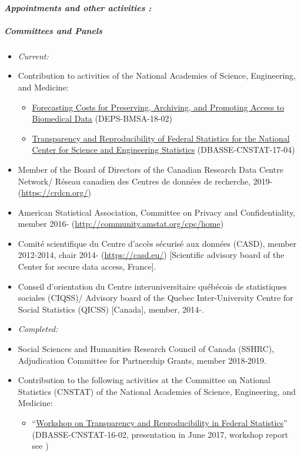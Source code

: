 \documentclass[10pt,letterpaper]{report}
\begin{document}
\paragraph{\it \bf Appointments and other activities :}%
\subparagraph{Committees and Panels} 
\begin{itemize}
	\item[] \textit{Current:}
	\item Contribution to activities of the National Academies of Science, Engineering, and Medicine:
	\begin{itemize}
		\item \href{https://www8.nationalacademies.org/pa/projectview.aspx?key=51436}{Forecasting Costs for Preserving, Archiving, and Promoting Access to Biomedical Data} (DEPS-BMSA-18-02)
		\item \href{https://www8.nationalacademies.org/pa/projectview.aspx?key=51187}{Transparency and Reproducibility of Federal Statistics for the National Center for Science and Engineering Statistics} (DBASSE-CNSTAT-17-04)
	\end{itemize} 
	\item Member of the Board of Directors of the Canadian Research Data Centre Network/ R\'eseau canadien des Centres de donn\'ees de recherche, 2019- (\url{https://crdcn.org/})
	\item American Statistical Association, Committee on Privacy and Confidentiality, member 2016- (\url{http://community.amstat.org/cpc/home})
	\item Comit\'e scientifique du Centre d'acc\`es s\'ecuris\'e aux 
	donn\'ees (CASD), member 2012-2014, chair 2014- (\url{https://casd.eu/}) [Scientific advisory board of the Center for secure data 
	access, France].
	\item Conseil d'orientation du Centre interuniversitaire 
	qu\'eb\'ecois de statistiques sociales (CIQSS)/ Advisory board of the Quebec Inter-University 
	Centre for Social Statistics (QICSS) [Canada], member, 2014-.
	\item[] \textit{Completed:}
	\item Social Sciences and Humanities Research Council of Canada (SSHRC), Adjudication Committee for Partnership Grants, member 2018-2019.
	\item Contribution to the following activities at the Committee on National Statistics (CNSTAT) of the National Academies of Science, Engineering, and Medicine:
	\begin{itemize}
		\item ``\href{https://www8.nationalacademies.org/pa/projectview.aspx?key=49809}{Workshop on Transparency and Reproducibility in Federal Statistics}'' (DBASSE-CNSTAT-16-02, presentation in June 2017, workshop report see \cite{NAP25305})

\end{itemize}
\end{itemize}
\end{document}

